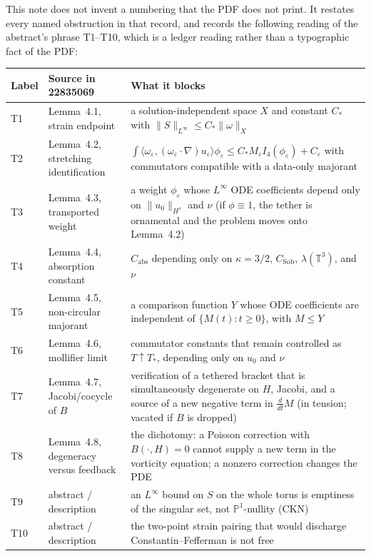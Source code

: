\documentclass[11pt]{article}
\theoremstyle{plain}
\theoremstyle{definition}
\theoremstyle{remark}
\newcommand{\Tthree}{\mathbb{T}^{3}}
\begin{document}
This note does not invent a numbering that the PDF does not print. It restates every named obstruction in that record, and records the following reading of the abstract's phrase T1--T10, which is a ledger reading rather than a typographic fact of the PDF:
\begin{center}
\small
\begin{tabularx}{\linewidth}{@{}>{\raggedright\arraybackslash}p{0.7in}>{\raggedright\arraybackslash}p{1.7in}X@{}}
\toprule
Label & Source in 22835069 & What it blocks \\
\midrule
T1 & Lemma~4.1, strain endpoint & a solution-independent space \(X\) and constant \(C_{\ast}\) with \(\|S\|_{L^{\infty}}\le C_{\ast}\|\omega\|_{X}\) \\
T2 & Lemma~4.2, stretching identification & \(\int\langle\omega_{\varepsilon},(\omega_{\varepsilon}\cdot\nabla)u_{\varepsilon}\rangle\phi_{\varepsilon}\le C_{\ast}M_{\varepsilon}I_{4}(\phi_{\varepsilon})+C_{\varepsilon}\) with commutators compatible with a data-only majorant \\
T3 & Lemma~4.3, transported weight & a weight \(\phi_{\varepsilon}\) whose \(L^{\infty}\) ODE coefficients depend only on \(\|u_{0}\|_{H^{s}}\) and \(\nu\) (if \(\phi\equiv 1\), the tether is ornamental and the problem moves onto Lemma~4.2) \\
T4 & Lemma~4.4, absorption constant & \(C_{\mathrm{abs}}\) depending only on \(\kappa=3/2\), \(C_{\mathrm{Sob}}\), \(\lambda(\Tthree)\), and \(\nu\) \\
T5 & Lemma~4.5, non-circular majorant & a comparison function \(Y\) whose ODE coefficients are independent of \(\{M(t):t\ge 0\}\), with \(M\le Y\) \\
T6 & Lemma~4.6, mollifier limit & commutator constants that remain controlled as \(T\uparrow T_{\ast}\), depending only on \(u_{0}\) and \(\nu\) \\
T7 & Lemma~4.7, Jacobi/cocycle of \(B\) & verification of a tethered bracket that is simultaneously degenerate on \(H\), Jacobi, and a source of a new negative term in \(\frac{d}{dt}M\) (in tension; vacated if \(B\) is dropped) \\
T8 & Lemma~4.8, degeneracy versus feedback & the dichotomy: a Poisson correction with \(B(\cdot,H)=0\) cannot supply a new term in the vorticity equation; a nonzero correction changes the PDE \\
T9 & abstract / description & an \(L^{\infty}\) bound on \(S\) on the whole torus is emptiness of the singular set, not \(\mathbb{P}^{1}\)-nullity (CKN) \\
T10 & abstract / description & the two-point strain pairing that would discharge Constantin--Fefferman is not free \\
\bottomrule
\end{tabularx}
\end{center}
\end{document}
